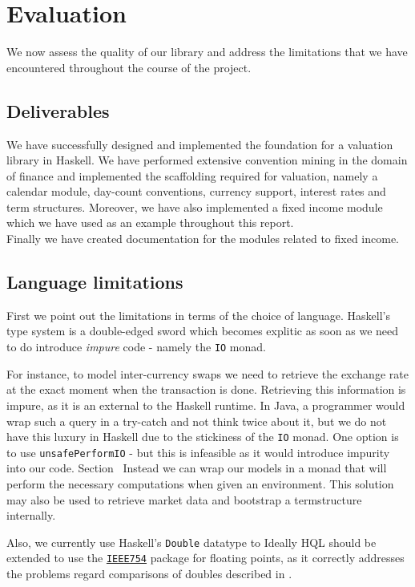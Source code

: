 \chapter{Evaluation}

We now assess the quality of our library and address the limitations that we
have encountered throughout the course of the project.

\section{Deliverables}

We have successfully designed and implemented the foundation for a valuation 
library in Haskell. We have performed extensive convention mining in the domain
of finance and implemented the scaffolding required for valuation, 
namely a calendar module, day-count conventions, currency support, interest 
rates and term structures. Moreover, we have also implemented a fixed income 
module which we have used as an example throughout this report.\\

Finally we have created documentation for the modules related to fixed 
income\cite{hqldoc}.

\section{Language limitations}

First we point out the limitations in terms of the choice of language.
Haskell's type system is a double-edged sword which becomes explitic as soon 
as we need to do introduce \emph{impure} code - namely the \texttt{IO} monad.

For instance, to model inter-currency swaps we need to retrieve the exchange 
rate at the exact moment when the transaction is done. Retrieving this 
information is impure, as it is an external to the Haskell runtime. In Java, a 
programmer would wrap such a query in a try-catch and not think twice about it, 
but we do not have this luxury in Haskell due to the stickiness of the 
\texttt{IO} monad. One option is to use \texttt{unsafePerformIO} - but this is 
infeasible as it would introduce impurity into our code.
Section \ Instead we can wrap our models in a monad that will perform the necessary 
computations when given an environment. This solution may also be used to 
retrieve market data and bootstrap a termstructure internally.

Also, we currently use Haskell's \texttt{Double} datatype to 
Ideally HQL should be extended to use the \href{https://hackage.haskell.org/package/data-binary-ieee754}{\texttt{IEEE754}} package for floating 
points, as it correctly addresses the problems regard comparisons of 
doubles described in \cite{blogpost}.

